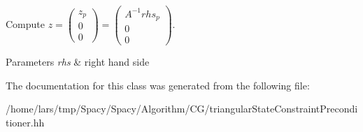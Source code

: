 Compute $ z = \left( \begin{array}{c} z_p \\ 0 \\ 0 \end{array} \right) = \left( \begin{array}{c} A^{-1}rhs_p \\ 0 \\ 0 \end{array} \right) $. 


\begin{DoxyParams}{Parameters}
{\em rhs} & right hand side \\
\hline
\end{DoxyParams}


The documentation for this class was generated from the following file\+:\begin{DoxyCompactItemize}
\item 
/home/lars/tmp/\+Spacy/\+Spacy/\+Algorithm/\+C\+G/triangular\+State\+Constraint\+Preconditioner.\+hh\end{DoxyCompactItemize}
